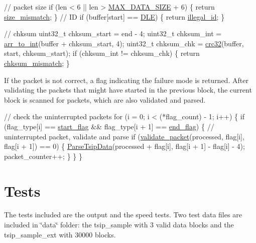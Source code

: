 \begin{DoxyCodeInclude}
  \textcolor{comment}{// packet size}
  \textcolor{keywordflow}{if} (len < 6 || len > \hyperlink{tsip__decode_8h_a87f68e96fb938eddc39ad1f19d923a96}{MAX\_DATA\_SIZE} + 6) \{
    \textcolor{keywordflow}{return} \hyperlink{tsip__decode_8h_ac1accdfaf17cd8ccf452c605fa935233a06e8eebf569c66387fe7e38059ceed79}{size\_mismatch};
  \}
  \textcolor{comment}{// ID}
  \textcolor{keywordflow}{if} (buffer[start] == \hyperlink{tsip__read_8h_add7018db64fb17dd1e4664b4494be0ee}{DLE}) \{
    \textcolor{keywordflow}{return} \hyperlink{tsip__decode_8h_ac1accdfaf17cd8ccf452c605fa935233aa7c3ec9f75a85e0e38eb97a1d7bd7490}{illegal\_id};
  \}

  \textcolor{comment}{// chksum}
  uint32\_t chksum\_start = end - 4;
  uint32\_t chksum\_int = \hyperlink{util_8h_ad96587305bb46bd47c2069e0aafd6530}{arr\_to\_int}(buffer + chksum\_start, 4);
  uint32\_t chksum\_chk = \hyperlink{util_8h_aa1921745f0c9cd9f201d624ca86dc40b}{crc32}(buffer, start, chksum\_start);
  \textcolor{keywordflow}{if} (chksum\_int != chksum\_chk) \{
    \textcolor{keywordflow}{return} \hyperlink{tsip__decode_8h_ac1accdfaf17cd8ccf452c605fa935233a732565fcd9231ccc944acf3624b80300}{chksum\_mismatch};
  \}
\end{DoxyCodeInclude}
 If the packet is not correct, a flag indicating the failure mode is returned. After validating the packets that might have started in the previous block, the current block is scanned for packets, which are also validated and parsed.


\begin{DoxyCodeInclude}
        \textcolor{comment}{// check the uninterrupted packets}
        \textcolor{keywordflow}{for} (i = 0; i < (*flag\_count) - 1; i++) \{
          \textcolor{keywordflow}{if} (flag\_type[i] == \hyperlink{tsip__decode_8h_aaadb960acba914ffc497ac7b256cdd55a4b507f9b9a7feb19dc7248d7de612717}{start\_flag} && flag\_type[i + 1] == 
      \hyperlink{tsip__decode_8h_aaadb960acba914ffc497ac7b256cdd55a5ed0c9e4189b86c84f9ded0501e9dd18}{end\_flag}) \{
            \textcolor{comment}{// uninterrupted packet, validate and parse}
            \textcolor{keywordflow}{if} (\hyperlink{tsip__decode_8h_a41c4ae0abb32c8c722925578007e711b}{validate\_packet}(processed, flag[i], flag[i + 1]) == 0) \{
              \hyperlink{tsip__read_8h_aaf187111fc27885f025120a9bf69de0d}{ParseTsipData}(processed + flag[i], flag[i + 1] - flag[i] - 4);
              packet\_counter++;
            \}
          \}
        \}
\end{DoxyCodeInclude}
 \hypertarget{index_Tests}{}\section{Tests}\label{index_Tests}
The tests included are the output and the speed tests. Two test data files are included in \char`\"{}data\char`\"{} folder\+: the tsip\+\_\+sample with 3 valid data blocks and the tsip\+\_\+sample\+\_\+ext with 30000 blocks.

